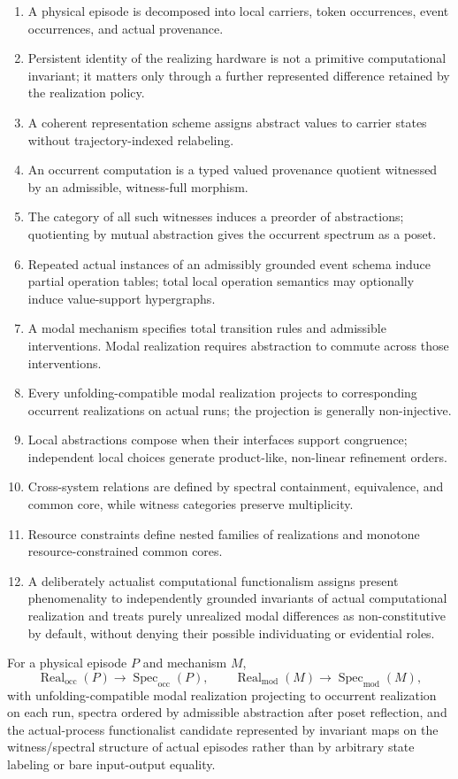 \documentclass[11pt,a4paper]{article}
\theoremstyle{clean}
\theoremstyle{definition}
\newcommand{\Spec}{\operatorname{Spec}}
\newcommand{\Real}{\operatorname{Real}}
\newcommand{\Occ}{\mathrm{occ}}
\newcommand{\Mod}{\mathrm{mod}}
\begin{document}
\begin{enumerate}
  \item A physical episode is decomposed into local carriers, token occurrences, event occurrences, and actual provenance.
  \item Persistent identity of the realizing hardware is not a primitive computational invariant; it matters only through a further represented difference retained by the realization policy.
  \item A coherent representation scheme assigns abstract values to carrier states without trajectory-indexed relabeling.
  \item An occurrent computation is a typed valued provenance quotient witnessed by an admissible, witness-full morphism.
  \item The category of all such witnesses induces a preorder of abstractions; quotienting by mutual abstraction gives the occurrent spectrum as a poset.
  \item Repeated actual instances of an admissibly grounded event schema induce partial operation tables; total local operation semantics may optionally induce value-support hypergraphs.
  \item A modal mechanism specifies total transition rules and admissible interventions. Modal realization requires abstraction to commute across those interventions.
  \item Every unfolding-compatible modal realization projects to corresponding occurrent realizations on actual runs; the projection is generally non-injective.
  \item Local abstractions compose when their interfaces support congruence; independent local choices generate product-like, non-linear refinement orders.
  \item Cross-system relations are defined by spectral containment, equivalence, and common core, while witness categories preserve multiplicity.
  \item Resource constraints define nested families of realizations and monotone resource-constrained common cores.
  \item A deliberately actualist computational functionalism assigns present phenomenality to independently grounded invariants of actual computational realization and treats purely unrealized modal differences as non-constitutive by default, without denying their possible individuating or evidential roles.
\end{enumerate}

\begin{summarybox}[title={One-line formal picture}]
For a physical episode $P$ and mechanism $M$,
\[
\Real_\Occ(P)\longrightarrow\Spec_\Occ(P),\qquad
\Real_\Mod(M)\longrightarrow\Spec_\Mod(M),
\]
with unfolding-compatible modal realization projecting to occurrent realization on each run, spectra ordered by admissible abstraction after poset reflection, and the actual-process functionalist candidate represented by invariant maps on the witness/spectral structure of actual episodes rather than by arbitrary state labeling or bare input-output equality.
\end{summarybox}
\end{document}
